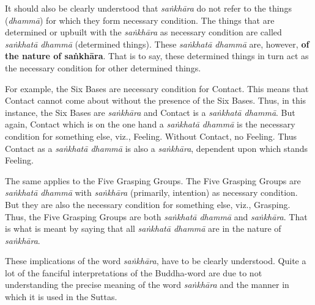 It should also be clearly understood that \emph{saṅkhāra} do not refer to the
things (\emph{dhammā}) for which they form necessary condition. The things
that are determined or upbuilt with the \emph{saṅkhāra} as necessary
condition are called \emph{saṅkhatā dhammā} (determined things). These
\emph{saṅkhatā dhammā} are, however, \textbf{of the nature of saṅkhāra}. That is
to say, these determined things in turn act as the necessary condition
for other determined things.


For example, the Six Bases are necessary
condition for Contact. This means that Contact cannot come about without
the presence of the Six Bases. Thus, in this instance, the Six Bases are
\emph{saṅkhāra} and Contact is a \emph{saṅkhatā dhammā}. But again, Contact
which is on the one hand a \emph{saṅkhatā dhammā} is the necessary condition
for something else, viz., Feeling. Without Contact, no Feeling. Thus
Contact as a \emph{saṅkhatā dhammā} is also a \emph{saṅkhāra}, dependent upon
which stands Feeling.


The same applies to the Five Grasping Groups. The
Five Grasping Groups are \emph{saṅkhatā dhammā} with \emph{saṅkhāra} (primarily,
intention) as necessary condition. But they are also the necessary
condition for something else, viz., Grasping. Thus, the Five Grasping
Groups are both \emph{saṅkhatā dhammā} and \emph{saṅkhāra}. That is what is
meant by saying that all \emph{saṅkhatā dhammā} are in the nature of
\emph{saṅkhāra}.


These implications of the word \emph{saṅkhāra}, have to be clearly
understood. Quite a lot of the fanciful interpretations of the
Buddha-word are due to not understanding the precise meaning of the word
\emph{saṅkhāra} and the manner in which it is used in the Suttas.


